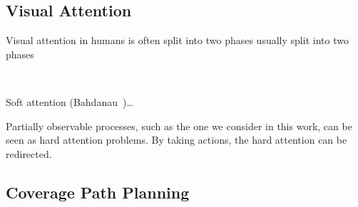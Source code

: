 \subsection{Visual Attention}

Visual attention in humans is often split into two phases usually split into two phases

~\cite{itti_koch_2001}





\cite{minut_mahadevan_2001}

\cite{mnih_attention_2014}

Soft attention (Bahdanau~\cite{bahdanau_attention_2016})\dots

Partially observable processes, such as the one we consider in this work, can be seen as hard attention problems.
By taking actions, the hard attention can be redirected.

\subsection{Coverage Path Planning}


